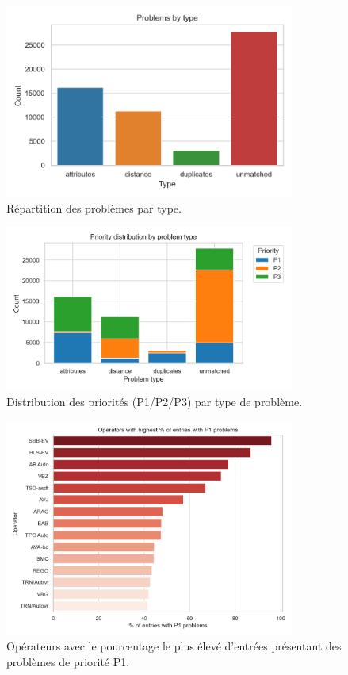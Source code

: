 \begin{figure}[H]
  \centering
  \includegraphics[width=0.85\textwidth]{../figures/chap6/problems_by_type.png}
  \caption[Problèmes par type]{Répartition des problèmes par type.}
\end{figure}

\begin{figure}[H]
  \centering
  \includegraphics[width=0.85\textwidth]{../figures/chap6/priority_by_type.png}
  \caption[Priorités par type]{Distribution des priorités (P1/P2/P3) par type de problème.}
\end{figure}


\begin{figure}[H]
  \centering
  \includegraphics[width=0.85\textwidth]{../figures/chap6/operators_p1_percentage.png}
  \caption[Opérateurs — part des P1]{Opérateurs avec le pourcentage le plus élevé d'entrées présentant des problèmes de priorité P1.}
\end{figure}
